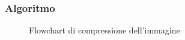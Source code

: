 \documentclass[11pt,italian]{article}
\begin{document}
\subsubsection*{Algoritmo}
\begin{figure}[H]
    \caption{Flowchart di compressione dell'immagine}
    \label{fig:flow-compression}
\end{figure}
\end{document}
